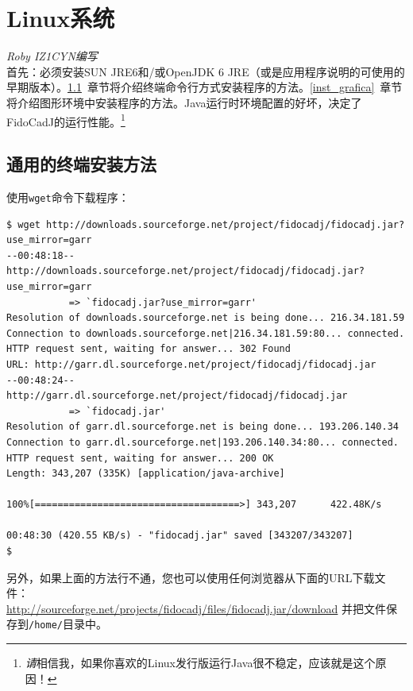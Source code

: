 \documentclass[10pt,a4paper,twoside]{scrreprt}
\begin{document}
\section{Linux系统}

\label{installazione_linux} \textsl{Roby IZ1CYN编写}\\

首先：必须安装SUN JRE6和/或OpenJDK 6 JRE（或是应用程序说明的可使用的早期版本）。\ref{inst_testo}~章节将介绍终端命令行方式安装程序的方法。\ref{inst_grafica}~章节将介绍图形环境中安装程序的方法。Java运行时环境配置的好坏，决定了FidoCadJ的运行性能。\footnote{\textit{请}相信我，如果你喜欢的Linux发行版运行Java很不稳定，应该就是这个原因！}

\subsection{通用的终端安装方法}

\label{inst_testo} 使用\lstinline!wget!命令下载程序：


\begin{lstlisting}
$ wget http://downloads.sourceforge.net/project/fidocadj/fidocadj.jar?use_mirror=garr
--00:48:18--  http://downloads.sourceforge.net/project/fidocadj/fidocadj.jar?use_mirror=garr
           => `fidocadj.jar?use_mirror=garr'
Resolution of downloads.sourceforge.net is being done... 216.34.181.59
Connection to downloads.sourceforge.net|216.34.181.59:80... connected.
HTTP request sent, waiting for answer... 302 Found
URL: http://garr.dl.sourceforge.net/project/fidocadj/fidocadj.jar
--00:48:24--  http://garr.dl.sourceforge.net/project/fidocadj/fidocadj.jar
           => `fidocadj.jar'
Resolution of garr.dl.sourceforge.net is being done... 193.206.140.34
Connection to garr.dl.sourceforge.net|193.206.140.34:80... connected.
HTTP request sent, waiting for answer... 200 OK
Length: 343,207 (335K) [application/java-archive]

100%[====================================>] 343,207      422.48K/s             

00:48:30 (420.55 KB/s) - "fidocadj.jar" saved [343207/343207]
$
\end{lstlisting}
\lstset{
	basicstyle=\small\ttfamily}

另外，如果上面的方法行不通，您也可以使用任何浏览器从下面的URL下载文件：\\
\href{http://sourceforge.net/projects/fidocadj/files/fidocadj.jar/download}{http://sourceforge.net/projects/fidocadj/files/fidocadj.jar/download}
并把文件保存到\lstinline!/home/!目录中。
\end{document}
